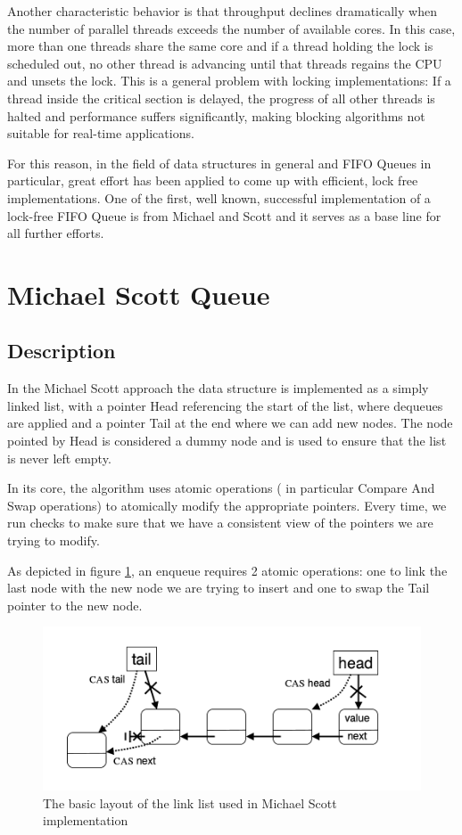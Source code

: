 Another characteristic behavior is that throughput declines dramatically when the number of parallel threads exceeds the number of available cores. In this case, more than one threads share the same core and if a thread holding the lock is scheduled out, no other thread is advancing until that threads regains the CPU and unsets the lock. This is a general problem with locking implementations: If a thread inside the critical section is delayed, the progress of all other threads is halted and performance suffers significantly, making blocking algorithms not suitable for real-time applications.


For this reason, in the field of data structures in general and FIFO Queues in particular, great effort has been applied to come up with efficient, lock free implementations. One of the first, well known, successful implementation of a lock-free FIFO Queue is from Michael and Scott \cite{msqueue} and it serves as a base line for all further efforts.

\section{Michael Scott Queue}
\subsection{Description}

In the Michael Scott approach the data structure is implemented as a simply linked list, with a pointer Head referencing the start of the list, where dequeues are applied and a pointer Tail at the end where we can add new nodes. The node pointed by Head is considered a dummy node  and is used to ensure that the list is never left empty.

In its core, the algorithm uses atomic operations ( in particular Compare And Swap operations) to atomically modify the appropriate pointers. Every time, we run checks to make sure that we have a consistent view of the pointers we are trying to modify.

As depicted in figure \ref{ms_queue_struct}, an enqueue requires 2 atomic operations: one to link the last node with the new node we are trying to insert and one to swap the Tail pointer to the new node.

\begin{figure}
 \centering
  \includegraphics[scale=0.4]{msqueue_struct.png}
\caption{ The basic layout of the link list used in Michael Scott implementation}
\label{ms_queue_struct}
\end{figure}


